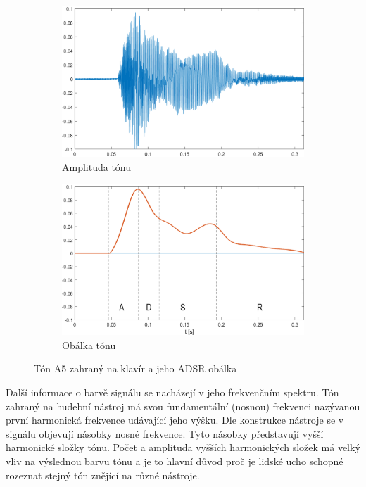   \begin{figure}[H]
    \centering
    \begin{subfigure}[b]{0.8\linewidth}
        \includegraphics[width = \linewidth]{obrazky/Piano_tone_waveform.png}
        \caption{Amplituda tónu}
    \end{subfigure}
    \begin{subfigure}[b]{0.8\linewidth}
        \includegraphics[width = \linewidth]{obrazky/Piano_tone_obalka.png}
        \caption{Obálka tónu}
    \end{subfigure}
    \caption{Tón A5 zahraný na klavír a jeho ADSR obálka}
    \label{fig:ADSR_envelope_on_piano_tone}
  \end{figure}

  Další informace o barvě signálu se nacházejí v jeho frekvenčním spektru. 
  Tón zahraný na hudební nástroj má svou fundamentální (nosnou) frekvenci nazývanou první harmonická frekvence udávající jeho výšku.
  Dle konstrukce nástroje se v signálu objevují násobky nosné frekvence.
  Tyto násobky představují vyšší harmonické složky tónu.
  Počet a amplituda vyšších harmonických složek má velký vliv na výslednou barvu tónu a je to hlavní důvod proč je lidské ucho schopné rozeznat stejný tón znějící na různé nástroje.

